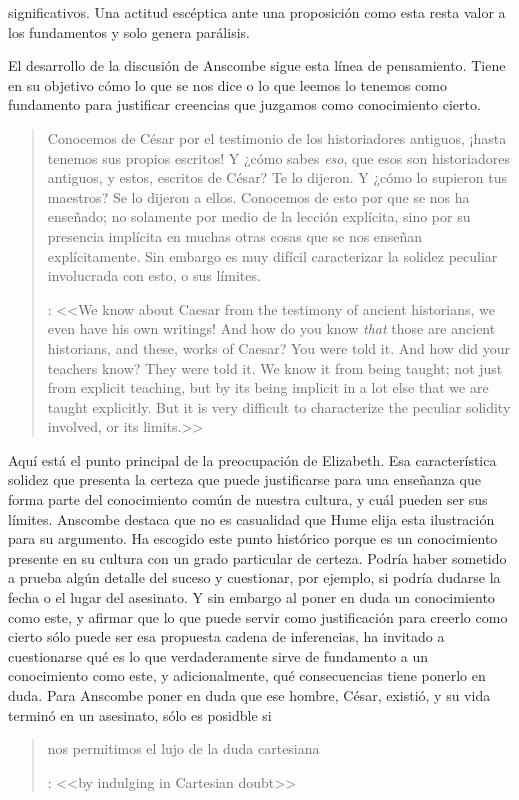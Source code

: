 significativos. Una actitud escéptica ante una proposición como esta resta valor a los fundamentos y solo genera parálisis.

El desarrollo de la discusión de Anscombe sigue esta línea de pensamiento. Tiene en su objetivo cómo lo que se nos dice o lo que leemos lo tenemos como fundamento para justificar creencias que juzgamos como conocimiento cierto.

\blockquote[{\cite[90]{anscombe1981parmenides:humeandjulius}}: <<We know about Caesar from the testimony of ancient historians, we even have his own writings! And how do you know \emph{that} those are ancient historians, and these, works of Caesar? You were told it. And how did your teachers know? They were told it. We know it from being taught; not just from explicit teaching, but by its being implicit in a lot else that we are taught explicitly. But it is very difficult to characterize the peculiar solidity involved, or its limits.>>]{Conocemos de César por el testimonio de los historiadores antiguos, ¡hasta tenemos sus propios escritos! Y ¿cómo sabes \emph{eso}, que esos son historiadores antiguos, y estos, escritos de César? Te lo dijeron. Y ¿cómo lo supieron tus maestros? Se lo dijeron a ellos. Conocemos de esto por que se nos ha enseñado; no solamente por medio de la lección explícita, sino por su presencia implícita en muchas otras cosas que se nos enseñan explícitamente. Sin embargo es muy difícil caracterizar la solidez peculiar involucrada con esto, o sus límites.} Aquí está el punto principal de la preocupación de Elizabeth. Esa característica solidez que presenta la certeza que puede justificarse para una enseñanza que forma parte del conocimiento común de nuestra cultura, y cuál pueden ser sus límites. Anscombe destaca que no es casualidad que Hume elija esta ilustración para su argumento. Ha escogido este punto histórico porque es un conocimiento presente en su cultura con un grado particular de certeza. Podría haber sometido a prueba algún detalle del suceso y cuestionar, por ejemplo, si podría dudarse la fecha o el lugar del asesinato. Y sin embargo al poner en duda un conocimiento como este, y afirmar que lo que puede servir como justificación para creerlo como cierto sólo puede ser esa propuesta cadena de inferencias, ha invitado a cuestionarse qué es lo que verdaderamente sirve de fundamento a un conocimiento como este, y adicionalmente, qué consecuencias tiene ponerlo en duda. Para Anscombe poner en duda que ese hombre, César, existió, y su vida terminó en un asesinato, sólo es posidble si \blockquote[{\cite[Cf.~][90]{anscombe1981parmenides:humeandjulius}}: <<by indulging in Cartesian doubt>>]{nos permitimos el lujo de la duda cartesiana}.

